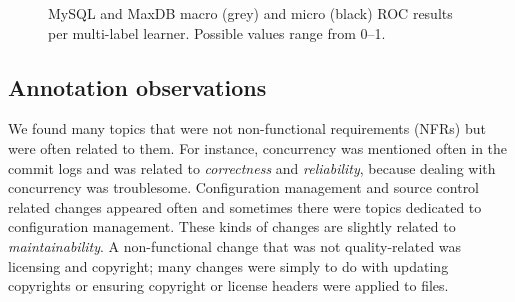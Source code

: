 \documentclass[]{sig-alternate}
\begin{document}
\begin{figure}[ht]
\centering
{}
\caption[]{MySQL and MaxDB macro (grey) and micro (black) ROC results per multi-label learner. Possible values range from 0--1.
}
\label{fig:mulan}
\end{figure}

\subsection{Annotation observations}
We found many topics that were not non-functional requirements (NFRs) but were often related to them. For instance, concurrency was mentioned often in the commit logs and was related to \emph{correctness} and \emph{reliability}, because dealing with concurrency was troublesome. Configuration management and source control related changes appeared often and sometimes there were topics dedicated to configuration management. These kinds of changes are slightly related to \emph{maintainability}. A non-functional change that was not quality-related was licensing and copyright; many changes were simply to do with updating copyrights or ensuring copyright or license headers were applied to files.
\end{document}
